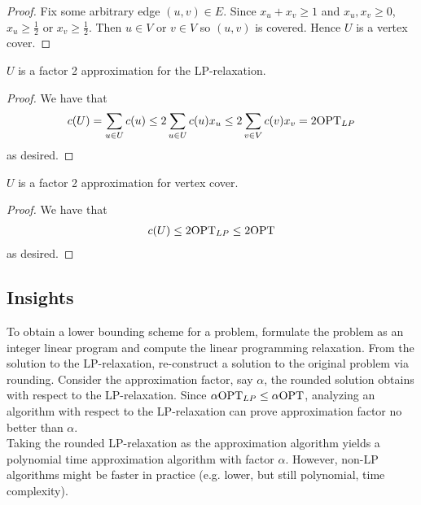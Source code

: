 \documentclass{article}
\begin{document}
\begin{proof}
    Fix some arbitrary edge $(u, v) \in E$. Since $x_u + x_v \geq 1$ and 
    $x_u, x_v \geq 0$, $x_u \geq \frac{1}{2}$ or $x_v \geq \frac{1}{2}$. Then $u \in V$
    or $v \in V$ so $(u, v)$ is covered. Hence $U$ is a vertex cover.
\end{proof}

\begin{theorem*}
    $U$ is a factor 2 approximation for the LP-relaxation.
\end{theorem*}

\begin{proof}
    We have that
    \begin{align*}
        c(U) = \sum\limits_{u \in U} c(u) \leq 2 \sum\limits_{u \in U} c(u) x_u \leq 
        2 \sum\limits_{v \in V} c(v) x_v = 2 \mathrm{OPT}_{LP}
    \end{align*}
    as desired.
\end{proof}

\begin{theorem*}
    $U$ is a factor 2 approximation for vertex cover.
\end{theorem*}

\begin{proof}
    We have that
    \begin{align*}
        c(U) \leq 2 \mathrm{OPT}_{LP} \leq 2 \mathrm{OPT}
    \end{align*}
    as desired.
\end{proof}

\subsection*{Insights}

To obtain a lower bounding scheme for a problem, formulate the problem as an integer 
linear program and compute the linear programming relaxation. From the solution to the 
LP-relaxation, re-construct a solution to the original problem via rounding. Consider 
the approximation factor, say $\alpha$, the rounded solution obtains with respect to the 
LP-relaxation. Since $\alpha \mathrm{OPT}_{LP} \leq \alpha \mathrm{OPT}$, analyzing an algorithm with 
respect to the LP-relaxation can prove approximation factor no better than $\alpha$. \\

\noindent
Taking the rounded LP-relaxation as the approximation algorithm yields a polynomial time
approximation algorithm with factor $\alpha$. However, non-LP algorithms might be faster
in practice (e.g. lower, but still polynomial, time complexity).
\end{document}
